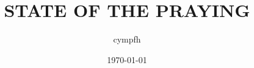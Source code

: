 \begin{titlepage}
    \title{STATE OF THE PRAYING }
    \date{\today}
    \author{cympfh}
    \maketitle
    \thispagestyle{empty}
\end{titlepage}
